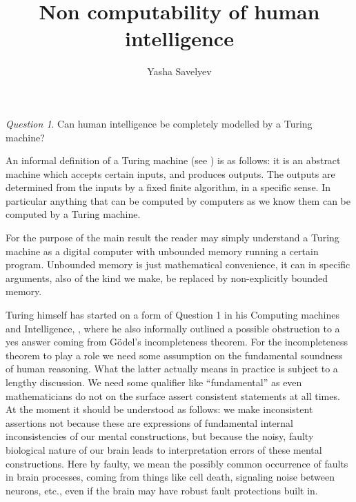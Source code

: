 \documentclass[9pt,twocolumn,twoside,lineno]{pnas-new}
\title{Non computability of human intelligence}
\author{Yasha Savelyev}
\affil{Universidad de Colima, Facultad de sciencias, Bernal Díaz del Castillo 340
Col. Villas San Sebastian,
28045, Colima, Colima,
Mexico}
\numberwithin{equation}{section}
\theoremstyle{definition}
\theoremstyle{remark}
\newtheorem{question}{Question}
\begin{document}
\maketitle
\thispagestyle{firststyle}

%
\begin{question} \label{quest1}
 Can human intelligence  be completely modelled by a Turing machine?  
\end{question}
An informal definition of a 
Turing machine (see \cite{TuringComputableNumbers}) is as follows: 
it is an abstract machine which accepts certain inputs, and produces outputs. The outputs are determined from the inputs by a fixed finite algorithm, in a specific sense.
In particular anything that can be computed by computers as we know them can be computed by a Turing machine. 

For the purpose of the main result the reader may simply understand a Turing machine as  a digital computer with unbounded memory running a certain program. Unbounded memory is just mathematical convenience, it can in specific arguments, also of the kind we make, be replaced by non-explicitly bounded memory.

Turing himself has started on a form of Question 1 in his Computing machines and Intelligence, \cite{TuringComputingMachines}, where he also informally outlined a  possible obstruction to a yes answer coming from G\"odel's incompleteness theorem. For the incompleteness theorem to play a role we need some assumption on the fundamental soundness of human reasoning.
 What the latter actually means in practice is subject to a lengthy discussion. We need some qualifier like ``fundamental'' as even mathematicians do not on the surface assert consistent statements at all times.  At the moment it should be understood as follows: we make inconsistent assertions not because these are expressions of fundamental internal inconsistencies of our mental constructions, but because the noisy, faulty biological nature of our brain leads to interpretation errors of these mental constructions. Here by faulty, we mean the possibly common occurrence of faults in brain processes, coming from things like cell death, signaling noise between neurons, etc., even if the brain may have robust fault protections built in.
\end{document}
